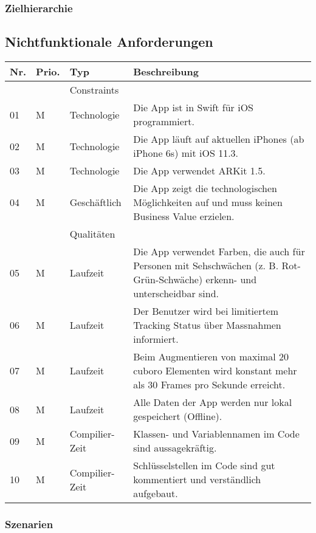 \subsubsection{Zielhierarchie}

\subsection{Nichtfunktionale Anforderungen}

\begin{longtable}{l l l p{10cm}}
	\hline
	\textbf{Nr.} & \textbf{Prio.} & \textbf{Typ} & \textbf{Beschreibung} \\
	\hline
	 & & Constraints & \\
	\hline
	01 & M & Technologie & Die App ist in Swift für iOS programmiert. \\
	02 & M & Technologie & Die App läuft auf aktuellen iPhones (ab iPhone 6s) mit iOS 11.3. \\
	03 & M & Technologie & Die App verwendet ARKit 1.5. \\
	04 & M & Geschäftlich & Die App zeigt die technologischen Möglichkeiten auf und muss keinen Business Value erzielen. \\
	\hline
	 & & Qualitäten & \\
	\hline
	05 & M & Laufzeit & Die App verwendet Farben, die auch für Personen mit Sehschwächen (z. B. Rot-Grün-Schwäche) erkenn- und unterscheidbar sind. \\ 
	06 & M & Laufzeit & Der Benutzer wird bei limitiertem Tracking Status über Massnahmen informiert. \\
	07 & M & Laufzeit & Beim Augmentieren von maximal 20 cuboro Elementen wird konstant mehr als 30 Frames pro Sekunde erreicht. \\
	08 & M & Laufzeit & Alle Daten der App werden nur lokal gespeichert (Offline). \\
	09 & M & Compilier-Zeit & Klassen- und Variablennamen im Code sind aussagekräftig. \\
	10 & M & Compilier-Zeit & Schlüsselstellen im Code sind gut kommentiert und verständlich aufgebaut. \\
	\hline
\end{longtable}

\subsubsection{Szenarien}

